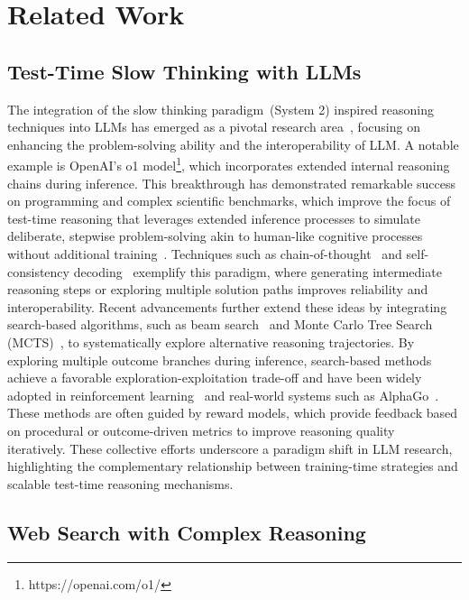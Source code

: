 \section{Related Work}
\label{sec:related}

\subsection{Test-Time Slow Thinking with LLMs}

The integration of the slow thinking paradigm~(\aka System 2) inspired reasoning techniques into LLMs has emerged as a pivotal research area~\cite{sutton2019bitter, wang2024q, kahneman2011thinking}, focusing on enhancing the problem-solving ability and the interoperability of LLM. A notable example is OpenAI’s o1 model\footnote{https://openai.com/o1/}, which incorporates extended internal reasoning chains during inference. 
This breakthrough has demonstrated remarkable success on programming and complex scientific benchmarks, which improve the focus of test-time reasoning that leverages extended inference processes to simulate deliberate, stepwise problem-solving akin to human-like cognitive processes without additional training~\cite{zhang2024llama, putta2024agent, luo2024improve}. Techniques such as chain-of-thought~\cite{wei2022chain} and self-consistency decoding~\cite{wangself} exemplify this paradigm, where generating intermediate reasoning steps or exploring multiple solution paths improves reliability and interoperability.
Recent advancements further extend these ideas by integrating search-based algorithms, such as beam search~\cite{kang2024mindstar} and Monte Carlo Tree Search (MCTS)~\cite{zhoulanguage, chen2024alphamath, zhang2024rest}, to systematically explore alternative reasoning trajectories. By exploring multiple outcome branches during inference, search-based methods achieve a favorable exploration-exploitation trade-off and have been widely adopted in reinforcement learning~\cite{hart1968formal, silver2017mastering} and real-world systems such as AlphaGo~\cite{silver2016mastering}. These methods are often guided by reward models, which provide feedback based on procedural or outcome-driven metrics to improve reasoning quality~\cite{snell2024scaling} iteratively. 
These collective efforts underscore a paradigm shift in LLM research, highlighting the complementary relationship between training-time strategies and scalable test-time reasoning mechanisms. 



\subsection{Web Search with Complex Reasoning}


